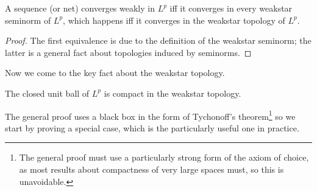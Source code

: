 \begin{lemma}
A sequence (or net) converges weakly in $L^{p}$ iff it converges in every weakstar seminorm of $L^{p}$, which happens iff it converges in the weakstar topology of $L^{p}$.
\end{lemma}
\begin{proof}
The first equivalence is due to the definition of the weakstar seminorm; the latter is a general fact about topologies induced by seminorms.
\end{proof}

Now we come to the key fact about the weakstar topology.

\begin{theoremx}
The closed unit ball of $L^{p}$ is compact in the weakstar topology.
\end{theoremx}

The general proof uses a black box in the form of Tychonoff's theorem\footnote{The general proof must use a particularly strong form of the axiom of choice, as most results about compactness of very large spaces must, so this is unavoidable.} so we start by proving a special case, which is the particularly useful one in practice.

